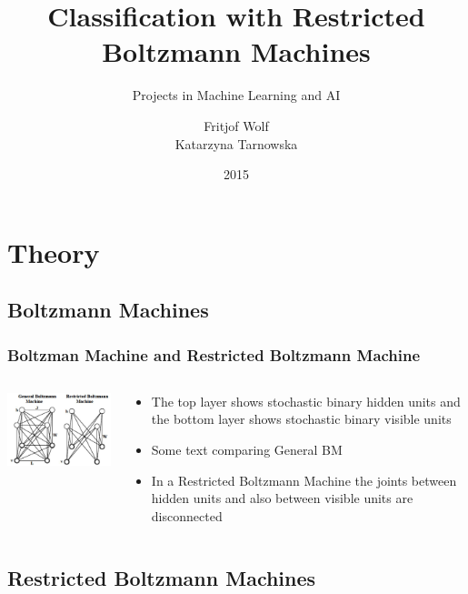 \documentclass{beamer}
\title{Classification with Restricted Boltzmann Machines}
\subtitle{Projects in Machine Learning and AI}
\author{Fritjof Wolf \\ Katarzyna Tarnowska}
\institute{Technische Universitat Berlin}
\date{2015}
\begin{document}
  
  \begin{frame}[plain]
    \titlepage  
  \end{frame}
  \section{Theory}
  \subsection{Boltzmann Machines} 
  \begin{frame}
  \frametitle{Boltzman Machine and Restricted Boltzmann Machine}
  \begin{columns}
     \begin{column}{0.5\textwidth}
	 \includegraphics[width=6cm]{images/BM.png}
	 \end{column}
	 \begin{column}{0.5\textwidth}
		\begin{itemize}
		\item The top layer shows stochastic binary hidden units and the bottom layer shows stochastic binary visible units
		\item Some text comparing General BM
		\item In a Restricted Boltzmann Machine the joints between hidden units and also between visible units are disconnected
		\end{itemize}
	 \end{column}
	\end{columns} 
  \end{frame}
  \subsection{Restricted Boltzmann Machines}
  
\end{document}
